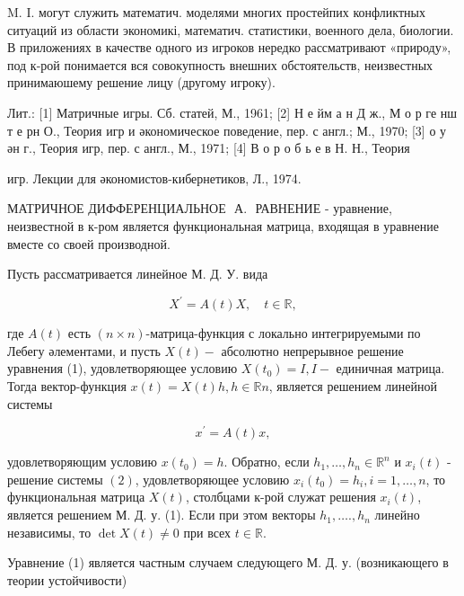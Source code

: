 \documentclass[10pt]{article}
\begin{document}
M. I. могут служить математич. моделями многих простейпих конфликтных ситуаций из области экономикі, математич. статистики, военного дела, биологии. В приложениях в качестве одного из игроков нередко рассматривают «природу», под к-рой понимается вся совокупность внешних обстоятельств, неизвестных принимаюшему решение лицу (другому игроку).



Лит.: [1] Матричные игры. Сб. статей, М., 1961; [2] Н е йм а н Д ж., М о р ге нш т е рн О., Теория игр и әкономическое поведение, пер. с англ.; М., 1970; [3] о у ән г., Теория игр, пер. с англ., М., 1971; [4] В о р о б ь е в Н. Н., Теория

игр. Лекции для әкономистов-кибернетиков, Л., 1974.



МАТРИЧНОЕ ДИФФЕРЕНЦИАЛЬНОЕ $\stackrel{ }{\text { А. }}$ РАВНЕНИЕ - уравнение, неизвестной в к-ром является функциональная матрица, входящая в уравнение вместе со своей производной.



Пусть рассматривается линейное М. Д. У. вида



\[

X^{\prime}=A(t) X, \quad t \in \mathbb{R},

\]



где $A(t)$ есть $(n \times n)$-матрица-функция с локально интегрируемыми по Лебегу әлементами, и пусть $X(t)-$ абсолютно непрерывное решение уравнения (1), удовлетворяющее условию $X\left(t_{0}\right)=I, I-$ единичная матрица. Тогда вектор-функция $x(t)=X(t) h, h \in \mathbb{R} n$, является решением линейной системы



\[

x^{\prime}=A(t) x,

\]



удовлетворяющим условию $x\left(t_{0}\right)=h$. Обратно, если $h_{1}, \ldots, h_{n} \in \mathbb{R}^{n}$ и $x_{i}(t)$ - решение системы $(2)$, удовлетворяющее условию $x_{i}\left(t_{0}\right)=h_{i}, i=1, \ldots, n$, то функциональная матрица $X(t)$, столбцами к-рой служат решения $x_{i}(t)$, является решением М. Д. у. (1). Если при этом векторы $h_{1}, \ldots ., h_{n}$ линейно независимы, то $\operatorname{det} X(t) \neq 0$ при всех $t \in \mathbb{R}$.



Уравнение (1) является частным случаем следующего М. Д. у. (возникающего в теории устойчивости)
\end{document}
